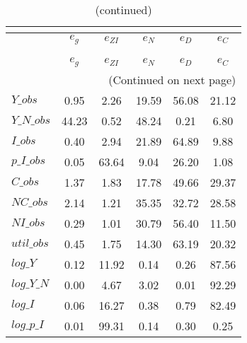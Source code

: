  
\begin{center}
\begin{longtable}{lccccc} 
\caption{VARIANCE DECOMPOSITION (in percent)}\\
 \label{Table:th_var_decomp_uncond}\\
\toprule 
$           $	 & 	 $       {e_g}$	 & 	 $    {e_{ZI}}$	 & 	 $       {e_N}$	 & 	 $       {e_D}$	 & 	 $       {e_C}$\\
\midrule \endfirsthead 
\caption{(continued)}\\
 \toprule \\ 
$           $	 & 	 $       {e_g}$	 & 	 $    {e_{ZI}}$	 & 	 $       {e_N}$	 & 	 $       {e_D}$	 & 	 $       {e_C}$\\
\midrule \endhead 
\midrule \multicolumn{6}{r}{(Continued on next page)} \\ \bottomrule \endfoot 
\bottomrule \endlastfoot 
$Y\_obs     $	 & 	        0.95	 & 	        2.26	 & 	       19.59	 & 	       56.08	 & 	       21.12 \\ 
$Y\_N\_obs  $	 & 	       44.23	 & 	        0.52	 & 	       48.24	 & 	        0.21	 & 	        6.80 \\ 
$I\_obs     $	 & 	        0.40	 & 	        2.94	 & 	       21.89	 & 	       64.89	 & 	        9.88 \\ 
$p\_I\_obs  $	 & 	        0.05	 & 	       63.64	 & 	        9.04	 & 	       26.20	 & 	        1.08 \\ 
$C\_obs     $	 & 	        1.37	 & 	        1.83	 & 	       17.78	 & 	       49.66	 & 	       29.37 \\ 
$NC\_obs    $	 & 	        2.14	 & 	        1.21	 & 	       35.35	 & 	       32.72	 & 	       28.58 \\ 
$NI\_obs    $	 & 	        0.29	 & 	        1.01	 & 	       30.79	 & 	       56.40	 & 	       11.50 \\ 
$util\_obs  $	 & 	        0.45	 & 	        1.75	 & 	       14.30	 & 	       63.19	 & 	       20.32 \\ 
$log\_Y     $	 & 	        0.12	 & 	       11.92	 & 	        0.14	 & 	        0.26	 & 	       87.56 \\ 
$log\_Y\_N  $	 & 	        0.00	 & 	        4.67	 & 	        3.02	 & 	        0.01	 & 	       92.29 \\ 
$log\_I     $	 & 	        0.06	 & 	       16.27	 & 	        0.38	 & 	        0.79	 & 	       82.49 \\ 
$log\_p\_I  $	 & 	        0.01	 & 	       99.31	 & 	        0.14	 & 	        0.30	 & 	        0.25 \\ 

\end{longtable}
\end{center}
